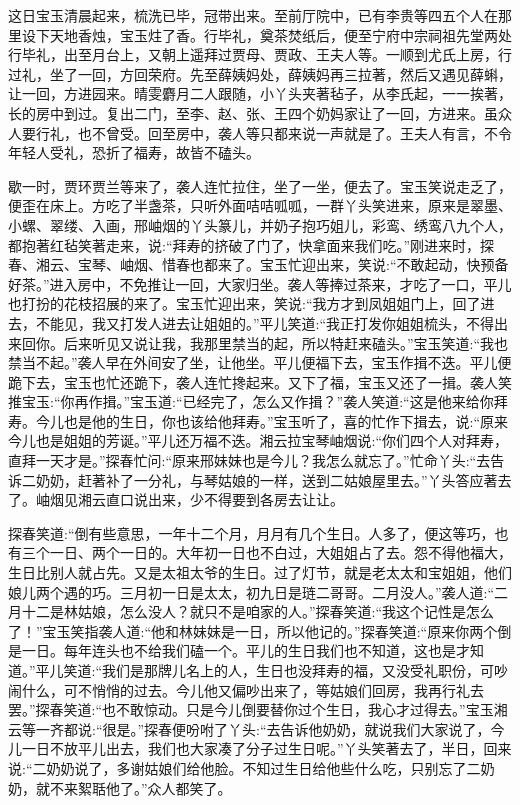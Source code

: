 \begin{parag}
    这日宝玉清晨起来，梳洗已毕，冠带出来。至前厅院中，已有李贵等四五个人在那里设下天地香烛，宝玉炷了香。行毕礼，奠茶焚纸后，便至宁府中宗祠祖先堂两处行毕礼，出至月台上，又朝上遥拜过贾母、贾政、王夫人等。一顺到尤氏上房，行过礼，坐了一回，方回荣府。先至薛姨妈处，薛姨妈再三拉著，然后又遇见薛蝌，让一回，方进园来。晴雯麝月二人跟随，小丫头夹著毡子，从李氏起，一一挨著，长的房中到过。复出二门，至李、赵、张、王四个奶妈家让了一回，方进来。虽众人要行礼，也不曾受。回至房中，袭人等只都来说一声就是了。王夫人有言，不令年轻人受礼，恐折了福寿，故皆不磕头。
\end{parag}


\begin{parag}
    歇一时，贾环贾兰等来了，袭人连忙拉住，坐了一坐，便去了。宝玉笑说走乏了，便歪在床上。方吃了半盏茶，只听外面咭咭呱呱，一群丫头笑进来，原来是翠墨、小螺、翠缕、入画，邢岫烟的丫头篆儿，并奶子抱巧姐儿，彩鸾、绣鸾八九个人，都抱著红毡笑著走来，说:“拜寿的挤破了门了，快拿面来我们吃。”刚进来时，探春、湘云、宝琴、岫烟、惜春也都来了。宝玉忙迎出来，笑说:“不敢起动，快预备好茶。”进入房中，不免推让一回，大家归坐。袭人等捧过茶来，才吃了一口，平儿也打扮的花枝招展的来了。宝玉忙迎出来，笑说:“我方才到凤姐姐门上，回了进去，不能见，我又打发人进去让姐姐的。”平儿笑道:“我正打发你姐姐梳头，不得出来回你。后来听见又说让我，我那里禁当的起，所以特赶来磕头。”宝玉笑道:“我也禁当不起。”袭人早在外间安了坐，让他坐。平儿便福下去，宝玉作揖不迭。平儿便跪下去，宝玉也忙还跪下，袭人连忙搀起来。又下了福，宝玉又还了一揖。袭人笑推宝玉:“你再作揖。”宝玉道:“已经完了，怎么又作揖？”袭人笑道:“这是他来给你拜寿。今儿也是他的生日，你也该给他拜寿。”宝玉听了，喜的忙作下揖去，说:“原来今儿也是姐姐的芳诞。”平儿还万福不迭。湘云拉宝琴岫烟说:“你们四个人对拜寿，直拜一天才是。”探春忙问:“原来邢妹妹也是今儿？我怎么就忘了。”忙命丫头:“去告诉二奶奶，赶著补了一分礼，与琴姑娘的一样，送到二姑娘屋里去。”丫头答应著去了。岫烟见湘云直口说出来，少不得要到各房去让让。
\end{parag}


\begin{parag}
    探春笑道:“倒有些意思，一年十二个月，月月有几个生日。人多了，便这等巧，也有三个一日、两个一日的。大年初一日也不白过，大姐姐占了去。怨不得他福大，生日比别人就占先。又是太祖太爷的生日。过了灯节，就是老太太和宝姐姐，他们娘儿两个遇的巧。三月初一日是太太，初九日是琏二哥哥。二月没人。”袭人道:“二月十二是林姑娘，怎么没人？就只不是咱家的人。”探春笑道:“我这个记性是怎么了！”宝玉笑指袭人道:“他和林妹妹是一日，所以他记的。”探春笑道:“原来你两个倒是一日。每年连头也不给我们磕一个。平儿的生日我们也不知道，这也是才知道。”平儿笑道:“我们是那牌儿名上的人，生日也没拜寿的福，又没受礼职份，可吵闹什么，可不悄悄的过去。今儿他又偏吵出来了，等姑娘们回房，我再行礼去罢。”探春笑道:“也不敢惊动。只是今儿倒要替你过个生日，我心才过得去。”宝玉湘云等一齐都说:“很是。”探春便吩咐了丫头:“去告诉他奶奶，就说我们大家说了，今儿一日不放平儿出去，我们也大家凑了分子过生日呢。”丫头笑著去了，半日，回来说:“二奶奶说了，多谢姑娘们给他脸。不知过生日给他些什么吃，只别忘了二奶奶，就不来絮聒他了。”众人都笑了。
\end{parag}


